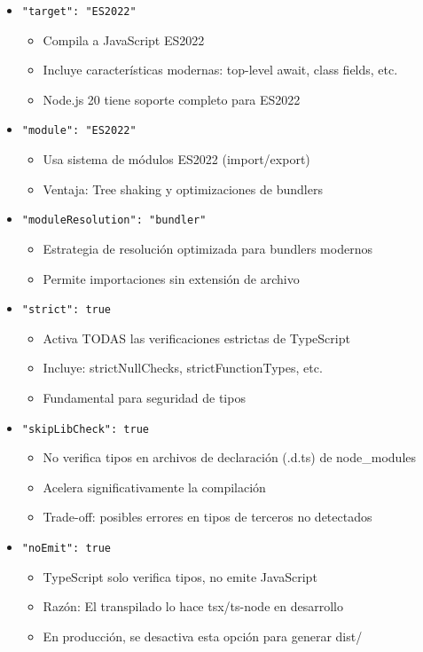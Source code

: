 \documentclass[12pt,a4paper]{article}
\begin{document}
\begin{itemize}
    \item \texttt{"target": "ES2022"}
    \begin{itemize}
        \item Compila a JavaScript ES2022
        \item Incluye características modernas: top-level await, class fields, etc.
        \item Node.js 20 tiene soporte completo para ES2022
    \end{itemize}

    \item \texttt{"module": "ES2022"}
    \begin{itemize}
        \item Usa sistema de módulos ES2022 (import/export)
        \item Ventaja: Tree shaking y optimizaciones de bundlers
    \end{itemize}

    \item \texttt{"moduleResolution": "bundler"}
    \begin{itemize}
        \item Estrategia de resolución optimizada para bundlers modernos
        \item Permite importaciones sin extensión de archivo
    \end{itemize}

    \item \texttt{"strict": true}
    \begin{itemize}
        \item Activa TODAS las verificaciones estrictas de TypeScript
        \item Incluye: strictNullChecks, strictFunctionTypes, etc.
        \item Fundamental para seguridad de tipos
    \end{itemize}

    \item \texttt{"skipLibCheck": true}
    \begin{itemize}
        \item No verifica tipos en archivos de declaración (.d.ts) de node\_modules
        \item Acelera significativamente la compilación
        \item Trade-off: posibles errores en tipos de terceros no detectados
    \end{itemize}

    \item \texttt{"noEmit": true}
    \begin{itemize}
        \item TypeScript solo verifica tipos, no emite JavaScript
        \item Razón: El transpilado lo hace tsx/ts-node en desarrollo
        \item En producción, se desactiva esta opción para generar dist/
    \end{itemize}
\end{itemize}
\end{document}
